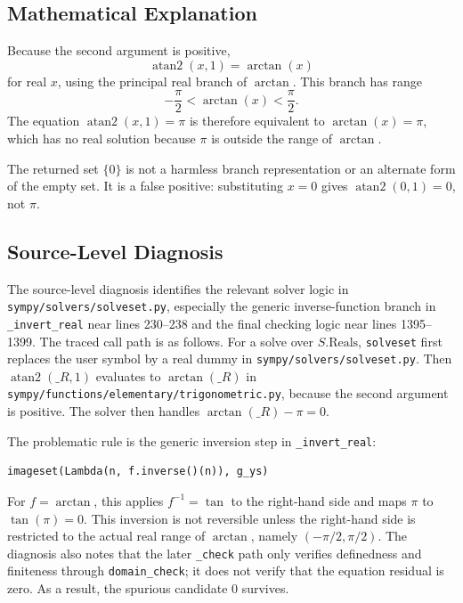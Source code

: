 \documentclass[11pt]{article}
\begin{document}
\subsection{Mathematical Explanation}

Because the second argument is positive,
\[
  \operatorname{atan2}(x,1)=\arctan(x)
\]
for real \(x\), using the principal real branch of \(\arctan\). This branch has
range
\[
  -\frac{\pi}{2}<\arctan(x)<\frac{\pi}{2}.
\]
The equation \(\operatorname{atan2}(x,1)=\pi\) is therefore equivalent to
\(\arctan(x)=\pi\), which has no real solution because \(\pi\) is outside the
range of \(\arctan\).

The returned set \(\{0\}\) is not a harmless branch representation or an
alternate form of the empty set. It is a false positive: substituting \(x=0\)
gives \(\operatorname{atan2}(0,1)=0\), not \(\pi\).

\subsection{Source-Level Diagnosis}

The source-level diagnosis identifies the relevant solver logic in
\nolinkurl{sympy/solvers/solveset.py}, especially the generic inverse-function
branch in \texttt{\_invert\_real} near lines 230--238 and the final checking
logic near lines 1395--1399. The traced call path is as follows. For a solve
over \(S.\mathrm{Reals}\), \texttt{solveset} first replaces the user symbol by a
real dummy in \nolinkurl{sympy/solvers/solveset.py}. Then
\(\operatorname{atan2}(\_R,1)\) evaluates to \(\arctan(\_R)\) in
\nolinkurl{sympy/functions/elementary/trigonometric.py}, because the second
argument is positive. The solver then handles
\(\arctan(\_R)-\pi=0\).

The problematic rule is the generic inversion step in \texttt{\_invert\_real}:

\begin{lstlisting}[style=bugpython]
imageset(Lambda(n, f.inverse()(n)), g_ys)
\end{lstlisting}

For \(f=\arctan\), this applies \(f^{-1}=\tan\) to the right-hand side and maps
\(\pi\) to \(\tan(\pi)=0\). This inversion is not reversible unless the
right-hand side is restricted to the actual real range of \(\arctan\), namely
\((-\pi/2,\pi/2)\). The diagnosis also notes that the later \texttt{\_check}
path only verifies definedness and finiteness through \texttt{domain\_check};
it does not verify that the equation residual is zero. As a result, the
spurious candidate \(0\) survives.
\end{document}
